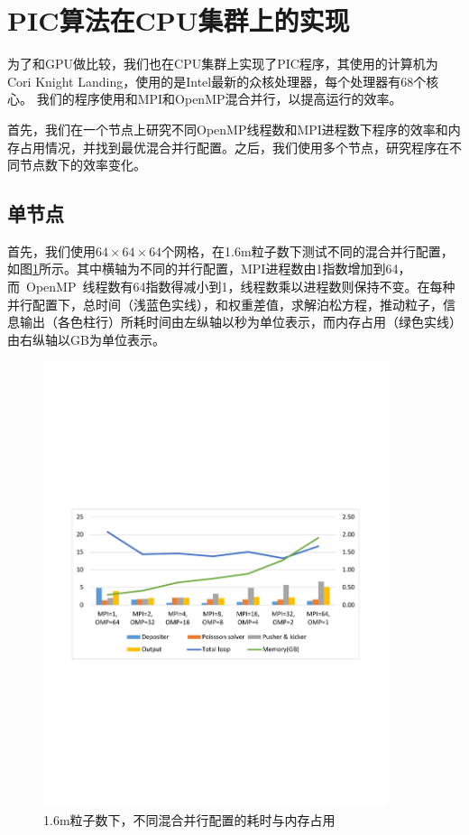 \section{PIC算法在CPU集群上的实现}        \label{section:PIC_CPUcluster}
为了和GPU做比较，我们也在CPU集群上实现了PIC程序，其使用的计算机为Cori Knight Landing，使用的是Intel最新的众核处理器，每个处理器有68个核心。
我们的程序使用和MPI和OpenMP混合并行，以提高运行的效率。

首先，我们在一个节点上研究不同OpenMP线程数和MPI进程数下程序的效率和内存占用情况，并找到最优混合并行配置。之后，我们使用多个节点，研究程序在不同节点数下的效率变化。

\subsection{单节点}
首先，我们使用$64 \times 64 \times 64$个网格，在1.6m粒子数下测试不同的混合并行配置，如图\ref{fig:PIC_speedup_Cori_1node_1_6m}所示。其中横轴为不同的并行配置，MPI进程数由1指数增加到64，而~OpenMP~线程数有64指数得减小到1，线程数乘以进程数则保持不变。在每种并行配置下，总时间（浅蓝色实线），和权重差值，求解泊松方程，推动粒子，信息输出（各色柱行）所耗时间由左纵轴以秒为单位表示，而内存占用（绿色实线）由右纵轴以GB为单位表示。

\begin{figure}[!htb]
  \centering
  \includegraphics[width=0.9\textwidth]{Img/PIC_speedup_Cori_1node_1_6m.pdf}
  \caption{1.6m粒子数下，不同混合并行配置的耗时与内存占用}
  \label{fig:PIC_speedup_Cori_1node_1_6m}
\end{figure}

